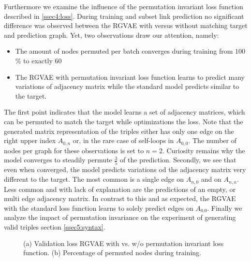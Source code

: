 Furthermore we examine the influence of the permutation invariant loss function described in \ref{ssec4:loss}. During training and subset link prediction no significant difference was observed between the RGVAE with versus without matching target and prediction graph. Yet, two observations draw our attention, namely:

\begin{itemize}
  \item The amount of nodes permuted per batch converges during training from $100$\% to exactly $60$%
  \item The RGVAE with permutation invariant loss function learns to predict many variations of adjacency matrix while the standard model predicts similar to the target.
\end{itemize}

The first point indicates that the model learns a set of adjacency matrices, which can be permuted to match the target while optimizations the loss. Note that the generated matrix representation of the triples either has only one edge on the right upper index $A_{0,n}$ or, in the rare case of self-loops in $A_{0,0}$. The number of nodes per graph for these observations is set to $n=2$. Curiosity remains why the model converges to steadily permute $\frac{3}{5}$ of the prediction.
Secondly, we see that even when converged, the model predicts variations od the adjacency matrix very different to the target. The most common is a single edge on $A_{n,0}$ and on $A_{n,n}$. Less common and with lack of explanation are the predictions of an empty, or multi edge adjacency matrix. In contrast to this and as expected, the RGVAE with the standard loss function learns to solely predict edges on $A_{0.0}$. 
Finally we analyze the impact of permutation invariance on the experiment of generating valid triples section \ref{ssec5:syntax}.





\begin{figure}
  \caption{(a) Validation loss RGVAE with vs. w/o permutation invariant loss function. (b) Percentage of permuted nodes during training.}
  \label{fig5:permInv}
\end{figure}

